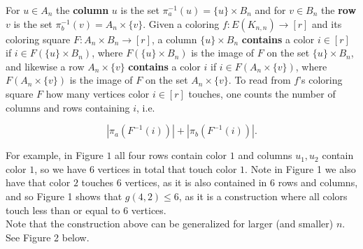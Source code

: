 \documentclass{article}
\begin{document}
 For $u \in A_n$ the \textbf{column} $u$ is the set $\pi_a^{-1}(u) = \{u\} \times B_n$ and for $v \in B_n$ the \textbf{row} $v$ is the set $\pi_b^{-1}(v) = A_n \times \{v\}$. Given a coloring $f : E(K_{n,n}) \rightarrow [r]$ and its coloring square $F: A_n \times B_n \rightarrow [r]$, a column $\{u\} \times B _n$ \textbf{contains} a color $i \in [r]$ if $i \in F(\{u\} \times B_n)$, where $F(\{u\} \times B_n)$ is the image of $F$ on the set $\{u\} \times B_n$, and likewise a row $A_n \times \{v\}$ \textbf{contains} a color $i$ if $i \in F(A_n \times \{v\})$, where $F(A_n \times \{v\})$ is the image of $F$ on the set $A_n \times \{v\}$. To read from $f$'s coloring square $F$ how many vertices color $i \in [r]$ touches, one counts the number of columns and rows containing $i$, i.e.

$$|\pi_a(F^{-1}(i))| + |\pi_b(F^{-1}(i))|.$$

\noindent
 For example, in Figure $1$ all four rows contain color $1$ and columns $u_1,u_2$ contain color $1$, so we have $6$ vertices in total that touch color $1$. Note in Figure 1 we also have that color $2$ touches $6$ vertices, as it is also contained in $6$ rows and columns, and so Figure 1 shows that $g(4,2) \leq 6$, as it is a construction where all colors touch less than or equal to $6$ vertices. \\

Note that the construction above can be generalized for larger (and smaller) $n$. See Figure 2 below. \\

\begin{center}
\end{center} 
\end{document}

